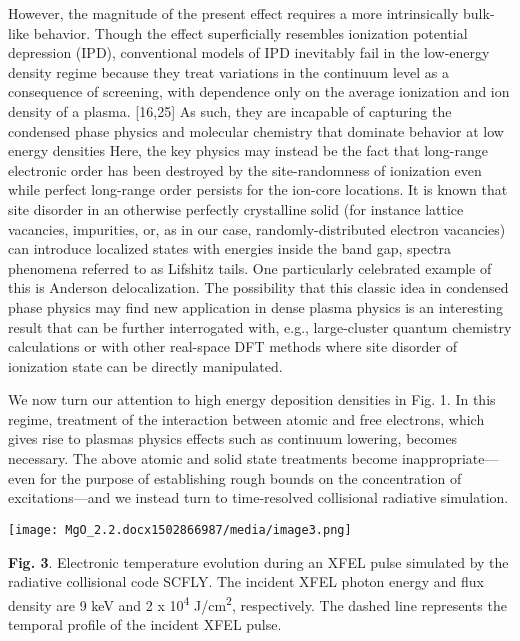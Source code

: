 However, the magnitude of the present effect requires a more
intrinsically bulk-like behavior. Though the effect superficially
resembles ionization potential depression (IPD), conventional models of
IPD inevitably fail in the low-energy density regime because they treat
variations in the continuum level as a consequence of screening, with
dependence only on the average ionization and ion density of a plasma.
{[}16,25{]} As such, they are incapable of capturing the condensed phase
physics and molecular chemistry that dominate behavior at low energy
densities Here, the key physics may instead be the fact that long-range
electronic order has been destroyed by the site-randomness of ionization
even while perfect long-range order persists for the ion-core locations.
It is known that site disorder in an otherwise perfectly crystalline
solid (for instance lattice vacancies, impurities, or, as in our case,
randomly-distributed electron vacancies) can introduce localized states
with energies inside the band gap, spectra phenomena referred to as
Lifshitz tails. \cite{NIEUWENHUIZEN1989TRAPPING} One particularly celebrated example of this is
Anderson delocalization. \cite{DE1998DELOCALIZATION} The possibility that this classic idea
in condensed phase physics may find new application in dense plasma
physics is an interesting result that can be further interrogated with,
e.g., large-cluster quantum chemistry calculations or with other
real-space DFT methods where site disorder of ionization state can be
directly manipulated.

We now turn our attention to high energy deposition densities in Fig. 1.
In this regime, treatment of the interaction between atomic and free
electrons, which gives rise to plasmas physics effects such as continuum
lowering, becomes necessary. The above atomic and solid state treatments
become inappropriate---even for the purpose of establishing rough bounds
on the concentration of excitations---and we instead turn to
time-resolved collisional radiative simulation.

\begin{center}
\texttt{[image: MgO\_2.2.docx1502866987/media/image3.png]}
\end{center}
\textbf{Fig. 3}. Electronic temperature evolution during an XFEL pulse
simulated by the radiative collisional code SCFLY. The incident XFEL
photon energy and flux density are 9 keV and 2 x 10\textsuperscript{4}
J/cm\textsuperscript{2}, respectively. The dashed line represents the
temporal profile of the incident XFEL pulse.


